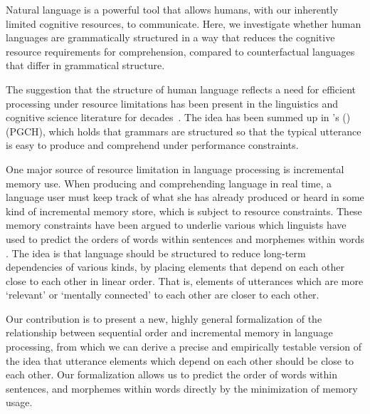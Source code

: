 
Natural language is a powerful tool that allows humans, with our inherently limited cognitive resources, to communicate.
Here, we investigate whether human languages are grammatically structured in a way that reduces the cognitive resource requirements for comprehension, compared to counterfactual languages that differ in grammatical structure.

The suggestion that the structure of human language reflects a need for efficient processing under resource limitations has been present in the linguistics and cognitive science literature for decades~\citep{yngve1960model,berwick1984grammatical,hawkins1994performance,chomsky2005three,jaeger2011language,gibson2019efficiency,hahn2020universals}. The idea has been summed up in \citeauthor{hawkins2004efficiency}'s (\citeyear{hawkins2004efficiency})  (PGCH), which holds that grammars are structured so that the typical utterance is easy to produce and comprehend under performance constraints.

One major source of resource limitation in language processing is incremental memory use. 
When producing and comprehending language in real time, a language user must keep track of what she has already produced or heard in some kind of incremental memory store, which is subject to resource constraints.
These memory constraints have been argued to underlie various  which linguists have used to predict the orders of words within sentences and morphemes within words \citep[e.g.][]{behaghel1932deutsche,givon1985iconicity,bybee-morphology-1985,rijkhoff-explaining-1990,hawkins1994performance,hawkins2004efficiency,hawkins2014crosslinguistic,temperley-minimizing-2018}.
The idea is that language should be structured to reduce long-term dependencies of various kinds, by placing elements that depend on each other close to each other in linear order.
That is, elements of utterances which are more `relevant' or `mentally connected' to each other are closer to each other.

Our contribution is to present a new, highly general formalization of the relationship between sequential order and incremental memory in language processing, from which we can derive a precise and empirically testable version of the idea that utterance elements which depend on each other should be close to each other. 
Our formalization allows us to predict the order of words within sentences, and morphemes within words directly by the minimization of memory usage.

